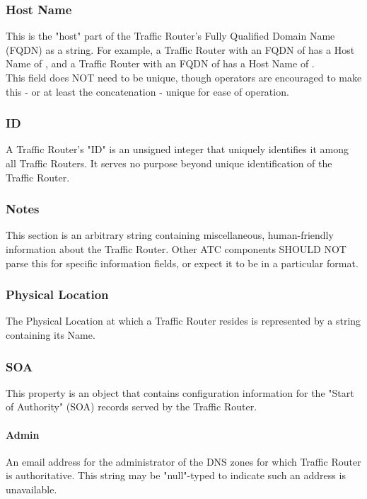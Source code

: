 \subsubsection{Host Name}
This is the "host" part of the Traffic Router's Fully Qualified Domain Name
(FQDN) as a string. For example, a Traffic Router with an FQDN of
 has a Host Name of , and a Traffic Router with an
FQDN of  has a Host Name of
.\\
This field does NOT need to be unique, though operators are encouraged to make
this - or at least the concatenation  - unique
for ease of operation.

\subsubsection{ID}
A Traffic Router's "ID" is an unsigned integer that uniquely identifies it among
all Traffic Routers. It serves no purpose beyond unique identification of the
Traffic Router.

\subsubsection{Notes}
This section is an arbitrary string containing miscellaneous, human-friendly
information about the Traffic Router. Other ATC components SHOULD NOT parse this
for specific information fields, or expect it to be in a particular format.

\subsubsection{Physical Location}
The Physical Location at which a Traffic Router resides is represented by a
string containing its Name.

\subsubsection{SOA}
This property is an object that contains configuration information for the
"Start of Authority" (SOA) records served by the Traffic Router.

\paragraph{Admin}
An email address for the administrator of the DNS zones for which Traffic Router
is authoritative. This string may be "null"-typed to indicate such an address is
unavailable.

